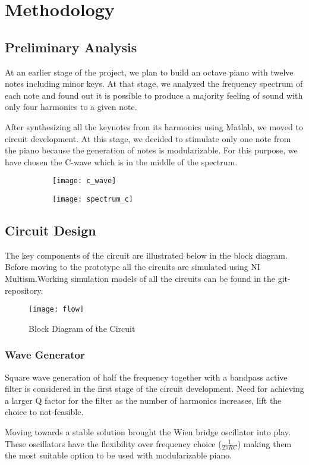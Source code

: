 \documentclass[class=article,crop=false,11pt]{standalone}
\begin{document}
\twocolumn

\section{Methodology}
\subsection{Preliminary Analysis}
At an earlier stage of the project, we plan to build an octave piano with twelve notes including minor keys. At that stage, we analyzed the frequency spectrum of each note and found out it is possible to produce a majority feeling of sound with only four harmonics to a given note.
\par
After synthesizing all the keynotes from its harmonics using Matlab, we moved to circuit development. At this stage, we decided to stimulate only one note from the piano because the generation of notes is modularizable. For this purpose, we have chosen the C-wave which is in the middle of the spectrum.
\begin{figure}
    \begin{subfigure}{.45\columnwidth}
        \centering
        \texttt{[image: c\_wave]}
    \end{subfigure}
    \begin{subfigure}{.45\columnwidth}
        \centering
        \texttt{[image: spectrum\_c]}
    \end{subfigure}

\end{figure}
\subsection{Circuit Design}
The key components of the circuit are illustrated below in the block diagram. Before moving to the prototype all the circuits are simulated using NI Multism.Working simulation models of all the circuits can be found in the git-repository.
\begin{figure}
    \begin{center}
        \texttt{[image: flow]}
        \caption*{Block Diagram of the Circuit}
    \end{center}
\end{figure}
\subsubsection{Wave Generator}
Square wave generation of half the frequency together with a bandpass active filter is considered in the first stage of the circuit development. Need for achieving a larger Q factor for the filter as the number of harmonics increases, lift the choice to not-feasible.
\par
Moving towards a stable solution brought the Wien bridge oscillator into play. These oscillators have the flexibility over frequency choice ($\frac{1}{2\pi RC}$) making them the most suitable option to be used with modularizable piano.
\end{document}
